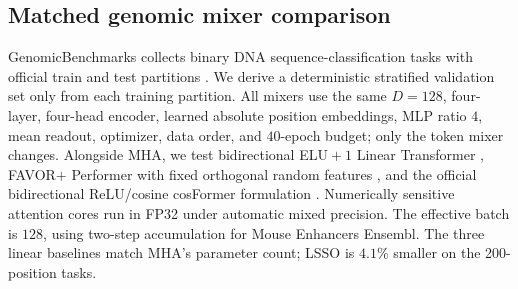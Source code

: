 \documentclass[10pt]{article}
\begin{document}
\subsection{Matched genomic mixer comparison}

GenomicBenchmarks collects binary DNA sequence-classification tasks with
official train and test partitions \cite{gresova2023genomicbenchmarks}.  We
derive a deterministic stratified validation set only from each training
partition.  All mixers use the same $D=128$, four-layer, four-head encoder,
learned absolute position embeddings, MLP ratio $4$, mean readout, optimizer,
data order, and $40$-epoch budget; only the token mixer changes.  Alongside MHA,
we test bidirectional ELU${}+1$ Linear Transformer
\cite{katharopoulos2020linear}, FAVOR$+$ Performer with fixed orthogonal
random features \cite{choromanski2021performer}, and the official bidirectional
ReLU/cosine cosFormer formulation \cite{qin2022cosformer}.  Numerically
sensitive attention cores run in FP32 under automatic mixed precision.  The
effective batch is $128$, using two-step accumulation for Mouse Enhancers
Ensembl.  The three linear baselines match MHA's parameter count; LSSO is
$4.1\%$ smaller on the 200-position tasks.
\end{document}
